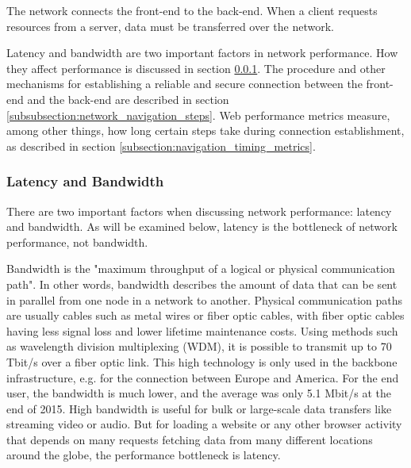 The network connects the front-end to the back-end.
When a client requests resources from a server, data must be transferred over the network.

Latency and bandwidth are two important factors in network performance.
How they affect performance is discussed in section \ref{subsubsection:latency_bandwidth}.
The procedure and other mechanisms for establishing a reliable and secure connection between the front-end and the back-end are described in section \ref{subsubsection:network_navigation_steps}.
Web performance metrics measure, among other things, how long certain steps take during connection establishment, as described in section \ref{subsection:navigation_timing_metrics}.




\subsubsection{Latency and Bandwidth} %
\label{subsubsection:latency_bandwidth}

There are two important factors when discussing network performance: latency and bandwidth.
As will be examined below, latency is the bottleneck of network performance, not bandwidth.



Bandwidth is the "maximum throughput of a logical or physical communication path". %
In other words, bandwidth describes the amount of data that can be sent in parallel from one node in a network to another. 
Physical communication paths are usually cables such as metal wires or fiber optic cables, with fiber optic cables having less signal loss and lower lifetime maintenance costs.
Using methods such as wavelength division multiplexing (WDM), it is possible to transmit up to 70 Tbit/s over a fiber optic link. %
This high technology is only used in the backbone infrastructure, e.g. for the connection between Europe and America.
For the end user, the bandwidth is much lower, and the average was only 5.1 Mbit/s at the end of 2015. %
High bandwidth is useful for bulk or large-scale data transfers like streaming video or audio.
But for loading a website or any other browser activity that depends on many requests fetching data from many different locations around the globe, the performance bottleneck is latency. %


